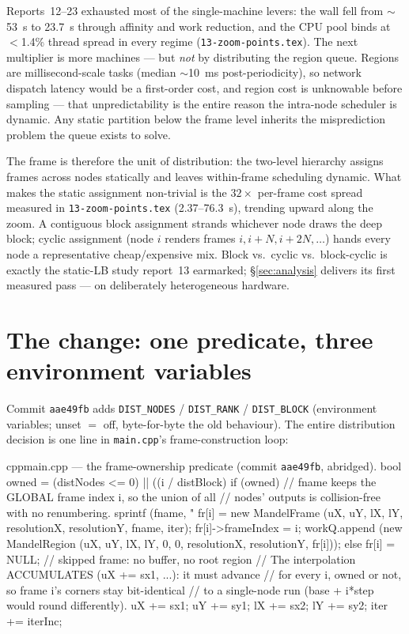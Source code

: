 \documentclass[
	english,
	letterpaper, oneside
]{article}
\begin{document}
Reports~12--23 exhausted most of the single-machine levers: the wall fell
from $\sim$53~s to 23.7~s through affinity and work reduction, and the CPU
pool binds at $<$1.4\% thread spread in every regime
(\texttt{13-zoom-points.tex}). The next multiplier is more machines --- but
\emph{not} by distributing the region queue. Regions are millisecond-scale
tasks (median $\sim$10~ms post-periodicity), so network dispatch latency
would be a first-order cost, and region cost is unknowable before sampling
--- that unpredictability is the entire reason the intra-node scheduler is
dynamic. Any static partition below the frame level inherits the
misprediction problem the queue exists to solve.

The frame is therefore the unit of distribution: the two-level hierarchy
assigns frames across nodes statically and leaves within-frame scheduling
dynamic. What makes the static assignment non-trivial is the $32\times$
per-frame cost spread measured in \texttt{13-zoom-points.tex}
(2.37--76.3~s), trending upward along the zoom. A contiguous block
assignment strands whichever node draws the deep block; cyclic assignment
(node $i$ renders frames $i, i{+}N, i{+}2N, \ldots$) hands every node a
representative cheap/expensive mix. Block vs.\ cyclic vs.\ block-cyclic is
exactly the static-LB study report~13 earmarked; \S\ref{sec:analysis}
delivers its first measured pass --- on deliberately heterogeneous hardware.

\section{The change: one predicate, three environment variables}
\label{sec:change}

Commit \texttt{aae49fb} adds \texttt{DIST\_NODES} / \texttt{DIST\_RANK} /
\texttt{DIST\_BLOCK} (environment variables; unset $=$ off, byte-for-byte
the old behaviour). The entire distribution decision is one line in
\texttt{main.cpp}'s frame-construction loop:

\begin{sourcecode}{cpp}{main.cpp --- the frame-ownership predicate (commit \texttt{aae49fb}, abridged).}
bool owned = (distNodes <= 0) || ((i / distBlock) %
if (owned)
  {
    // fname keeps the GLOBAL frame index i, so the union of all
    // nodes' outputs is collision-free with no renumbering.
    sprintf (fname, "%
    fr[i] = new MandelFrame (uX, uY, lX, lY, resolutionX, resolutionY, fname, iter);
    fr[i]->frameIndex = i;
    workQ.append (new MandelRegion (uX, uY, lX, lY, 0, 0,
                                    resolutionX, resolutionY, fr[i]));
  }
else
  fr[i] = NULL;       // skipped frame: no buffer, no root region
// The interpolation ACCUMULATES (uX += sx1, ...): it must advance
// for every i, owned or not, so frame i's corners stay bit-identical
// to a single-node run (base + i*step would round differently).
uX += sx1;  uY += sy1;  lX += sx2;  lY += sy2;  iter += iterInc;
\end{sourcecode}
\end{document}
